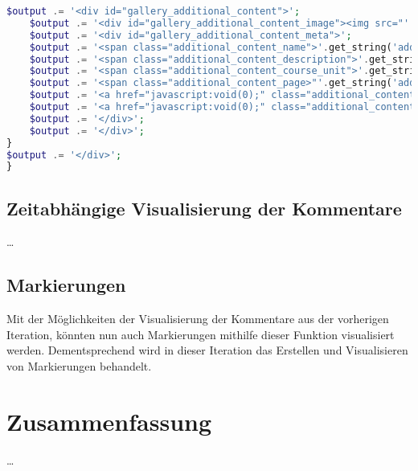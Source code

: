 \begin{lstlisting}[language=php,
             linewidth=\textwidth,
             caption={Ausschnitt der \textbf{renderer.php} in der 9. Iteration},
             label={lst:it9:renderer}]
	$output .= '<div id="gallery_additional_content">';
	$output .= '<div id="gallery_additional_content_image"><img src="'.$additional_content_url.'" border="5"></div>' ;
	$output .= '<div id="gallery_additional_content_meta">';
	$output .= '<span class="additional_content_name">'.get_string('additional_content_course_name', 'hyperaudio').': '.$additional_content->name.'</span>';
	$output .= '<span class="additional_content_description">'.get_string('additional_content_description', 'hyperaudio').': '.$additional_content->description.'</span>';
	$output .= '<span class="additional_content_course_unit">'.get_string('additional_content_course_unit', 'hyperaudio').': '.$additional_content->course_unit.'</span>';
	$output .= '<span class="additional_content_page>"'.get_string('additional_content_pages', 'hyperaudio').': '.$additional_content->page.'</span>';
	$output .= '<a href="javascript:void(0);" class="additional_content_begin" onclick="jump_to_time(this)" data-annotated_time="'.$additional_content->begin.'">'.get_string('additional_content_begin', 'hyperaudio').': '.$additional_content->begin.'</a>';
	$output .= '<a href="javascript:void(0);" class="additional_content_end" onclick="jump_to_time(this)" data-annotated_time="'.$additional_content->end.'">'.get_string('additional_content_end', 'hyperaudio').': '.$additional_content->end.'</a>';
	$output .= '</div>';
	$output .= '</div>';
}
$output .= '</div>';
}
\end{lstlisting}

\subsection{Zeitabhängige Visualisierung der Kommentare}
\dots

\subsection{Markierungen}
Mit der Möglichkeiten der Visualisierung der Kommentare aus der vorherigen Iteration, könnten nun auch Markierungen mithilfe dieser Funktion visualisiert werden. Dementsprechend wird in dieser Iteration das Erstellen und Visualisieren von Markierungen behandelt.

%


\section{Zusammenfassung}
\dots